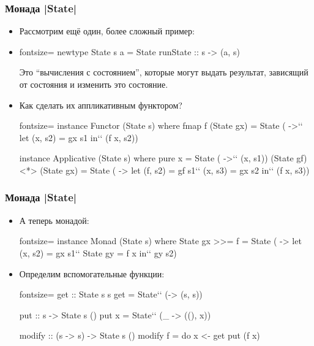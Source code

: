 \documentclass[11pt]{beamer}
\begin{document}
\begin{frame}[fragile]
  \frametitle{Монада \haskinline|State|}
  \begin{itemize}
    \item Рассмотрим ещё один, более сложный пример:
    \item
          \begin{haskell*}{fontsize=\footnotesize}
            newtype State s a = State { runState :: s -> (a, s) }
          \end{haskell*}
          Это \enquote{вычисления с состоянием}, которые могут выдать результат, зависящий от состояния и изменить это состояние.
    \item Как сделать их аппликативным функтором?
          \begin{haskell*}{fontsize=\footnotesize}
            instance Functor (State s) where
            fmap f (State gx) = State ( ->`\pause`
            let (x, s2) = gx s1
            in`\pause` (f x, s2))

            instance Applicative (State s) where
            pure x = State ( ->`\pause` (x, s1))
            (State gf) <*> (State gx) = State ( ->
            let (f, s2) = gf s1`\pause`
            (x, s3) = gx s2
            in`\pause` (f x, s3))
          \end{haskell*}
  \end{itemize}
\end{frame}

\begin{frame}[fragile]
  \frametitle{Монада \haskinline|State|}
  \begin{itemize}
    \item А теперь монадой:
          \begin{haskell*}{fontsize=\footnotesize}
            instance Monad (State s) where
            State gx >>= f = State ( ->
            let (x, s2) = gx s1`\pause`
            State gy = f x
            in`\pause` gy s2)
          \end{haskell*}
          \pause
    \item Определим вспомогательные функции:
          \begin{haskell*}{fontsize=\footnotesize}
            get :: State s s
            get = State`\pause` (\s -> (s, s))

            put :: s -> State s ()
            put x = State`\pause` (\_ -> ((), x))

            modify :: (s -> s) -> State s ()
            modify f = do x <- get
            put (f x)
          \end{haskell*}
  \end{itemize}
\end{frame}
\end{document}
